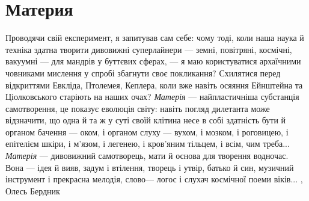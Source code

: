  
 
 
 
 
\chapter{Материя}

Проводячи свій експеримент, я запитував сам себе: чому тоді, коли наша наука й
техніка здатна творити дивовижні суперлайнери — земні, повітряні, космічні,
вакуумні — для мандрів у буттєвих сферах, — я маю користуватися архаїчними
човниками мислення у спробі збагнути своє покликання? Схилятися перед
відкриттями Евкліда, Птолемея, Кеплера, коли вже навіть осяяння Ейнштейна та
Ціолковського старіють на наших очах?  \emph{Матерія} — найпластичніша
субстанція самотворення, це показує еволюція світу: навіть погляд дилетанта
може відзначити, що одна й та ж у суті своїй клітина несе в собі здатність бути
й органом бачення — оком, і органом слуху — вухом, і мозком, і роговицею, і
епітелієм шкіри, і м’язом, і легенею, і кров’яним тільцем, і всім, чим треба...
\emph{Матерія} — дивовижний самотворець, мати й основа для творення водночас.
Вона — ідея й вияв, задум і втілення, творець і утвір, батько й син, музичний
інструмент і прекрасна мелодія, слово— логос і слухач космічної поеми віків...
, Олесь Бердник
